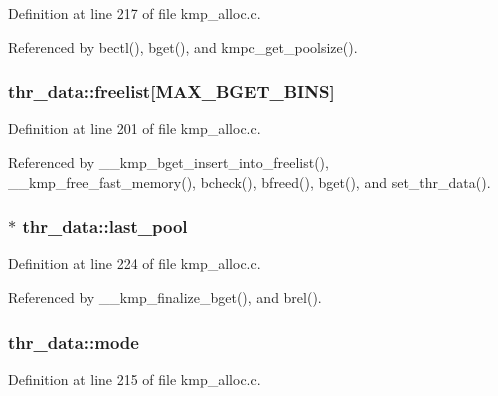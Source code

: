 Definition at line 217 of file kmp\-\_\-alloc.\-c.



Referenced by bectl(), bget(), and kmpc\-\_\-get\-\_\-poolsize().

\hypertarget{structthr__data_a1ebad8a4582b7e9d0ed15ca2f2448def}{
\subsubsection[{freelist}]{ thr\-\_\-data\-::freelist\mbox{[}{\bf M\-A\-X\-\_\-\-B\-G\-E\-T\-\_\-\-B\-I\-N\-S}\mbox{]}}}\label{structthr__data_a1ebad8a4582b7e9d0ed15ca2f2448def}


Definition at line 201 of file kmp\-\_\-alloc.\-c.



Referenced by \-\_\-\-\_\-kmp\-\_\-bget\-\_\-insert\-\_\-into\-\_\-freelist(), \-\_\-\-\_\-kmp\-\_\-free\-\_\-fast\-\_\-memory(), bcheck(), bfreed(), bget(), and set\-\_\-thr\-\_\-data().

\hypertarget{structthr__data_aac5ddbd2e9047f283da46c5ae55686fe}{
\subsubsection[{last\-\_\-pool}]{$\ast$ thr\-\_\-data\-::last\-\_\-pool}}\label{structthr__data_aac5ddbd2e9047f283da46c5ae55686fe}


Definition at line 224 of file kmp\-\_\-alloc.\-c.



Referenced by \-\_\-\-\_\-kmp\-\_\-finalize\-\_\-bget(), and brel().

\hypertarget{structthr__data_a790f977bb5c8b2b3409c1cf025c92f65}{
\subsubsection[{mode}]{ thr\-\_\-data\-::mode}}\label{structthr__data_a790f977bb5c8b2b3409c1cf025c92f65}


Definition at line 215 of file kmp\-\_\-alloc.\-c.



